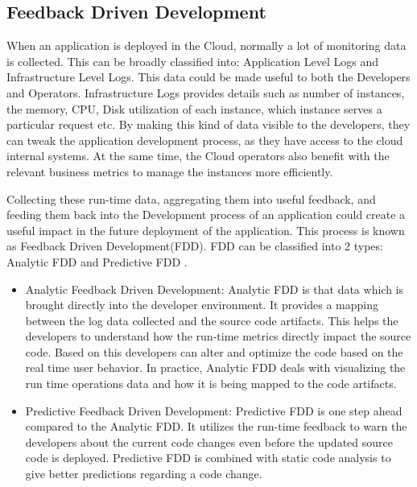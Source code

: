 \documentclass[article,type=msc,colorback,12pt,accentcolor=tud7b]{tudthesis}
\begin{document}
	\subsection{Feedback Driven Development } 		
	
	When an application is deployed in the Cloud, normally a lot of monitoring data is collected. This can be broadly classified into: Application Level Logs and Infrastructure Level Logs. This data could be made useful to both the Developers and Operators. Infrastructure Logs provides details such as number of instances, the memory, CPU, Disk utilization of each instance, which instance serves a particular request etc. By making this kind of data visible to the developers, they can tweak the application development process, as they have access to the cloud internal systems. At the same time, the Cloud operators also benefit with the relevant business metrics to manage the instances more efficiently. 
	
	\par Collecting these run-time data, aggregating them into useful feedback, and feeding them back into the Development process of an application could create a useful impact in the future deployment of the application. This process is known as Feedback Driven Development(FDD). FDD can be classified into 2 types: Analytic FDD and Predictive FDD \cite{cito2015runtime}.
	
	\begin{itemize}
	\item{Analytic Feedback Driven Development: }
		Analytic FDD is that data which is brought directly into the developer environment. It provides a mapping between the log data collected and the source code artifacts. This helps the developers to understand how the run-time metrics directly impact the source code. Based on this developers can alter and optimize the code based on the real time user behavior. In practice, Analytic FDD deals with visualizing the run time operations data and how it is being mapped to the code artifacts. 
		
	\item{Predictive Feedback Driven Development: }
	Predictive FDD is one step ahead compared to the Analytic FDD. It utilizes the run-time feedback to warn the developers about the current code changes even before the updated source code is deployed. Predictive FDD is combined with static code analysis to give better predictions regarding a code change. 
	\end{itemize}
	
\end{document}
